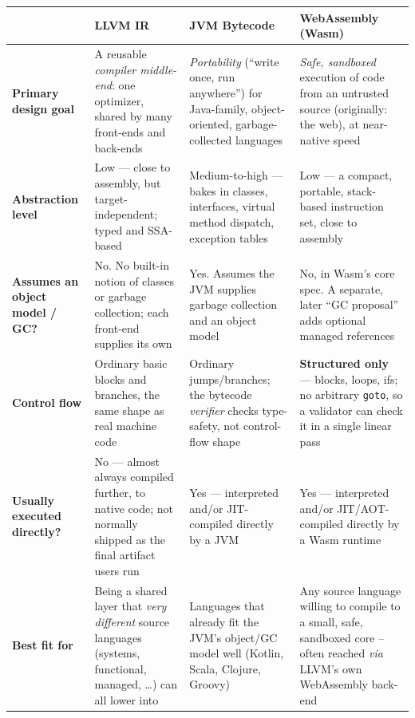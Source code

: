 \documentclass[full-course-notes.tex]{subfiles}
\begin{document}
\begin{center}
\renewcommand{\arraystretch}{1.5}
\small
\begin{tabularx}{\textwidth}{@{}l X X X@{}}
\toprule
 & \textbf{LLVM IR} & \textbf{JVM Bytecode} & \textbf{WebAssembly (Wasm)} \\
\midrule
\textbf{Primary design goal} & A reusable \emph{compiler middle-end}: one optimizer, shared by
many front-ends and back-ends & \emph{Portability} (``write once, run anywhere'') for
Java-family, object-oriented, garbage-collected languages & \emph{Safe, sandboxed} execution of
code from an untrusted source (originally: the web), at near-native speed \\
\textbf{Abstraction level} & Low --- close to assembly, but target-independent; typed and
SSA-based & Medium-to-high --- bakes in classes, interfaces, virtual method dispatch, exception
tables & Low --- a compact, portable, stack-based instruction set, close to assembly \\
\textbf{Assumes an object model / GC?} & No. No built-in notion of classes or garbage
collection; each front-end supplies its own & Yes. Assumes the JVM supplies garbage collection
and an object model & No, in Wasm's core spec. A separate, later ``GC proposal'' adds optional
managed references \\
\textbf{Control flow} & Ordinary basic blocks and branches, the same shape as real machine code
& Ordinary jumps/branches; the bytecode \emph{verifier} checks type-safety, not control-flow
shape & \textbf{Structured only} --- blocks, loops, ifs; no arbitrary \texttt{goto}, so a
validator can check it in a single linear pass \\
\textbf{Usually executed directly?} & No --- almost always compiled further, to native code; not
normally shipped as the final artifact users run & Yes --- interpreted and/or JIT-compiled
directly by a JVM & Yes --- interpreted and/or JIT/AOT-compiled directly by a Wasm runtime \\
\textbf{Best fit for} & Being a shared layer that \emph{very different} source languages
(systems, functional, managed, \dots) can all lower into & Languages that already fit the JVM's
object/GC model well (Kotlin, Scala, Clojure, Groovy) & Any source language willing to compile
to a small, safe, sandboxed core -- often reached \emph{via} LLVM's own WebAssembly back-end \\
\bottomrule
\end{tabularx}
\end{center}
\end{document}
